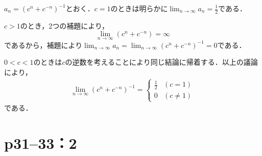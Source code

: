 \documentclass[a4paper,10pt,fleqn]{ltjsarticle}
\begin{document}
\begin{tleftbar}
    $a_n = (c^n +c^{-n})^{-1}$とおく．$c=1$のときは明らかに$\lim_{n \to \infty} a_n =\frac{1}{2}$である．

    $c>1$のとき，2つの補題により，
    \[
        \lim_{n \to \infty} (c^n + c^{-n}) = \infty
    \]
    であるから，補題により$\lim_{n \to \infty} a_n = \lim_{n \to \infty} (c^n +c^{-n})^{-1} =0$である．

    $0<c<1$のときは$c$の逆数を考えることにより同じ結論に帰着する．以上の議論により，
    \begin{align*}
        \lim_{n \to \infty} (c^n +c^{-n})^{-1} =
        \begin{cases}
            \frac{1}{2} & (c=1)     \\
            0           & (c \ne 1)
        \end{cases}
    \end{align*}
    である．
\end{tleftbar}


\section*{p31--33：2}
\end{document}
